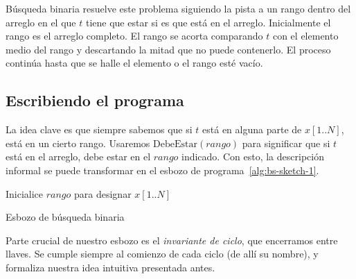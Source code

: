   Búsqueda binaria resuelve este problema
  siguiendo la pista a un rango dentro del arreglo
  en el que \(t\) tiene que estar
  si es que está en el arreglo.
  Inicialmente el rango es el arreglo completo.
  El rango se acorta comparando \(t\)
  con el elemento medio del rango
  y descartando la mitad que no puede contenerlo.
  El proceso continúa hasta que se halle el elemento
  o el rango esté vacío.

\subsection{Escribiendo el programa}
\label{sec:busqueda-binaria-escribir}

  La idea clave es que siempre sabemos que si \(t\)
  está en alguna parte de \(x[1..N]\),
  está en un cierto rango.
  Usaremos \(\mathrm{DebeEstar}(\mathit{rango})\)
  para significar que si \(t\) está en el arreglo,
  debe estar en el \(\mathit{rango}\) indicado.
  Con esto,
  la descripción informal
  se puede transformar
  en el esbozo de programa~\ref{alg:bs-sketch-1}.
  \begin{algorithm}[H]
    \DontPrintSemicolon
    Inicialice \(\mathit{rango}\) para designar \(x[1..N]\) \;
    \caption{Esbozo de búsqueda binaria}
    \label{alg:bs-sketch-1}
  \end{algorithm}
  Parte crucial de nuestro esbozo es el \emph{invariante de ciclo},
  que encerramos entre llaves.
  Se cumple siempre al comienzo de cada ciclo
  (de allí su nombre),
  y formaliza nuestra idea intuitiva presentada antes.

